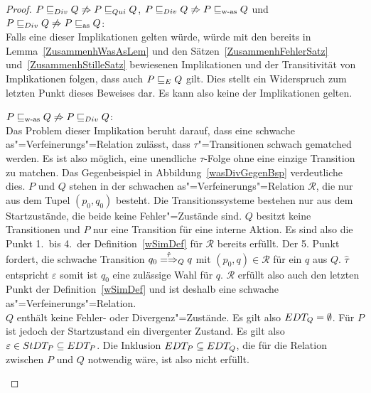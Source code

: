 \begin{proof}
  $P  \sqsubseteq  _{Div} Q \not\Rightarrow P  \sqsubseteq  _{Qui} Q$, $P  \sqsubseteq  _{Div} Q \not\Rightarrow P \sqsubseteq _{\mathrm{w}\text{-}\mathrm{as}}
  Q$ und $P  \sqsubseteq  _{Div} Q \not\Rightarrow P \sqsubseteq _{\mathrm{as}} Q$:\\
  Falls eine dieser Implikationen gelten würde, würde mit den bereits in
  Lemma~\ref{ZusammenhWasAsLem} und den Sätzen~\ref{ZusammenhFehlerSatz}
  und~\ref{ZusammenhStilleSatz} bewiesenen Implikationen und der Transitivität
  von Implikationen folgen, dass auch $P  \sqsubseteq  _E Q$ gilt. Dies stellt ein
  Widerspruch zum letzten Punkt dieses Beweises dar. Es kann also keine der
  Implikationen gelten.

  $P \sqsubseteq _{\mathrm{w}\text{-}\mathrm{as}} Q \not\Rightarrow P  \sqsubseteq  _{Div} Q$:\\
  Das Problem dieser Implikation beruht darauf, dass eine schwache
  as"=Verfeinerungs"=Relation zulässt, dass $\tau$"=Transitionen schwach
  gematched werden. Es ist also möglich, eine unendliche $\tau$-Folge ohne eine
  einzige Transition zu matchen. Das Gegenbeispiel in
  Abbildung~\ref{wasDivGegenBsp} verdeutliche dies. $P$ und $Q$ stehen in der
  schwachen as"=Verfeinerungs"=Relation $\mathcal{R}$, die nur aus dem Tupel
  $(p_0,q_0)$ besteht. Die Transitionssysteme bestehen nur aus dem
  Startzustände, die beide keine Fehler"=Zustände sind. $Q$ besitzt keine
  Transitionen und $P$ nur eine Transition für eine interne Aktion. Es sind
  also die Punkt 1.\ bis 4.\ der Definition~\ref{wSimDef} für $\mathcal{R}$
  bereits erfüllt. Der 5. Punkt fordert, die schwache Transition $q_0
  \weakmay[\hat{\tau}]_Q q$ mit $(p_0,q) \in \mathcal{R}$ für ein $q$ aus $Q$.
  $\hat{\tau}$ entspricht $\varepsilon$ somit ist $q_0$ eine zulässige Wahl für
  $q$. $\mathcal{R}$ erfüllt also auch den letzten Punkt der
  Definition~\ref{wSimDef} und ist deshalb eine schwache
  as"=Verfeinerungs"=Relation.\\
  $Q$ enthält keine Fehler- oder Divergenz"=Zustände. Es gilt also $EDT _Q=
  \emptyset$. Für $P$ ist jedoch der Startzustand ein divergenter Zustand. Es
  gilt also $\varepsilon \in StDT _P\subseteq EDT _P$. Die Inklusion $EDT _P
  \subseteq EDT _Q$, die für die Relation \DRel{} zwischen $P$ und $Q$
  notwendig wäre, ist also nicht erfüllt.

  \begin{figure}[htbp]
    \begin{center}
\end{center}
\end{figure}
\end{proof}
